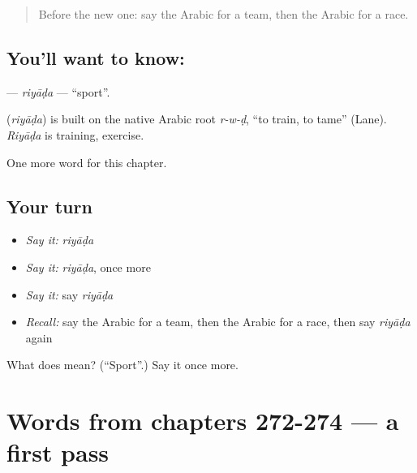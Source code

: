 \label{lesson:AR-C277-riyada}



\begin{quote}
Before the new one: say the Arabic for a team, then the Arabic for a race.
\end{quote}

\subsection*{You'll want to know: }
\textbf{} — \emph{riyāḍa} — \textquotedblleft{}sport\textquotedblright{}.

\begin{cousinweb}
\textbf{} (\emph{riyāḍa}) is built on the native Arabic root \emph{r-w-ḍ}, \textquotedblleft{}to train, to tame\textquotedblright{} (Lane). \emph{Riyāḍa} is training, exercise.
\end{cousinweb}

\begin{grammarlens}[title={What you've built}]
One more word for this chapter.
\end{grammarlens}

\subsection*{Your turn}
\begin{itemize}
\raggedright
  \item \emph{Say it:} \emph{riyāḍa}
  \item \emph{Say it:} \emph{riyāḍa}, once more
  \item \emph{Say it:} say \emph{riyāḍa}
  \item \emph{Recall:} say the Arabic for a team, then the Arabic for a race, then say \emph{riyāḍa} again
\end{itemize}

\begin{tcolorbox}[breakable,colback=teal!4,colframe=teal!35!black,title={Before you move on}]
What does  mean? (\textquotedblleft{}Sport\textquotedblright{}.) Say it once more.
\end{tcolorbox}
\section[(dialogue)]{Words from chapters 272-274 — a first pass}

\label{lesson:AR-R277-first-pass-words-from-chapters-272-274}



